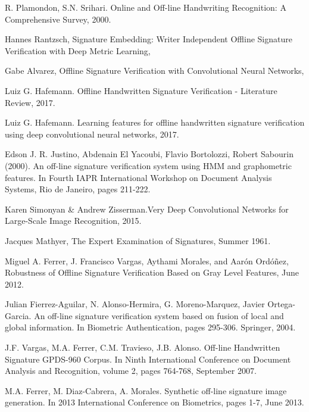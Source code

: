 \documentclass[11pt, twocolumn, a4paper]{article}
\begin{document}
\begin{thebibliography}{9}

R. Plamondon, S.N. Srihari. Online and Off-line Handwriting Recognition: A Comprehensive Survey, 2000.

Hannes Rantzsch, Signature Embedding: Writer Independent Offline Signature Verification with Deep Metric Learning,

Gabe Alvarez, Offline Signature Verification with Convolutional Neural Networks,

Luiz G. Hafemann. Offline Handwritten Signature Verification - Literature Review, 2017.

Luiz G. Hafemann. Learning features for offline handwritten signature verification using deep convolutional neural networks, 2017.

Edson J. R. Justino, Abdenain El Yacoubi, Flavio Bortolozzi, Robert Sabourin (2000). An off-line signature verification system using HMM and graphometric features. In Fourth IAPR International Workshop on Document Analysis Systems, Rio de Janeiro, pages 211-222.

Karen Simonyan \& Andrew Zisserman.Very Deep Convolutional Networks for Large-Scale Image Recognition, 2015.

Jacques Mathyer, The Expert Examination of Signatures, Summer 1961.

Miguel A. Ferrer, J. Francisco Vargas, Aythami Morales, and Aarón Ordóñez, Robustness of Offline Signature Verification Based on Gray Level Features, June 2012.

Julian Fierrez-Aguilar, N. Alonso-Hermira, G. Moreno-Marquez, Javier Ortega-Garcia. An off-line signature verification system based on fusion of local and global information. In Biometric Authentication, pages 295-306. Springer, 2004.

J.F. Vargas, M.A. Ferrer, C.M. Travieso, J.B. Alonso. Off-line Handwritten Signature GPDS-960 Corpus. In Ninth International Conference on Document Analysis and Recognition, volume 2, pages 764-768, September 2007.

M.A. Ferrer, M. Diaz-Cabrera, A. Morales. Synthetic off-line signature image generation. In 2013 International Conference on Biometrics, pages 1-7, June 2013.


\end{thebibliography}
\end{document}
